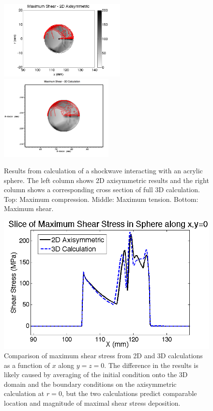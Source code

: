 \documentclass{article}
\begin{document}
\begin{figure}[h!]
\begin{center}
\vskip 5pt
\includegraphics[width=2.5in]{sphere_comp/max_shear_axisym_contour.png}
\includegraphics[width=2.25in]{sphere_comp/shear_contour_3d_annotate.png}
\caption{Results from 
calculation of a shockwave interacting with an acrylic sphere.
The left column shows 2D axisymmetric results and the right column shows
a corresponding cross section of full 3D calculation. 
Top: Maximum compression.  Middle: Maximum tension.  Bottom: Maximum shear.
\label{fig:sphere_comp_2d_3d}}
\end{center}
\end{figure}
%
\begin{figure}[h!]
\begin{center}
\includegraphics[width=5.in]{sphere_comp/max_shear_1D.png}
\caption{Comparison of maximum shear stress from 2D and 3D calculations
as a function of $x$ along $y=z=0$.  The difference in the results is likely caused by averaging of the initial 
condition onto the 3D domain and the boundary conditions on the axisymmetric calculation at $r=0$, but 
the two calculations predict comparable location and magnitude of maximal shear stress deposition. 
\label{fig:sphere_comp_shear}}
\end{center}
\end{figure}
\end{document}
